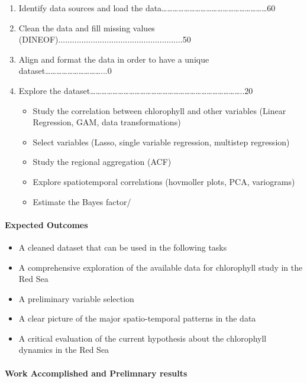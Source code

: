\begin{enumerate}
\item Identify data sources and load the data…………………………………………………60%
\item Clean the data and fill missing values (DINEOF)......................................................50%
\item Align and format the data in order to have a unique dataset…………………………...0%
\item Explore the dataset………………………………………………………………………..20%
\begin{itemize}
\item Study the correlation between chlorophyll and other variables (Linear Regression, GAM, data transformations)
\item Select variables (Lasso, single variable regression, multistep regression)
\item Study the regional aggregation (ACF)
\item Explore spatiotemporal correlations (hovmoller plots, PCA, variograms)
\item Estimate the Bayes factor/ %
\end{itemize}
\end{enumerate}

\paragraph{Expected Outcomes}

\begin{itemize}
\item A cleaned dataset that can be used in the following tasks
\item A comprehensive exploration of the available data for chlorophyll study in the Red Sea
\item A preliminary variable selection
\item A clear picture of the major spatio-temporal patterns in the data
\item A critical evaluation of the current hypothesis about the chlorophyll dynamics in the Red Sea
\end{itemize}

\paragraph{Work Accomplished and Prelimnary results}
